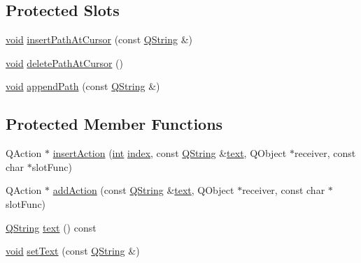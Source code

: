 \subsection*{Protected Slots}
\begin{DoxyCompactItemize}
\item 
\hyperlink{group___u_a_v_objects_plugin_ga444cf2ff3f0ecbe028adce838d373f5c}{void} \hyperlink{class_utils_1_1_path_list_editor_ab3be814407ee47387ca049bfd93780fb}{insert\-Path\-At\-Cursor} (const \hyperlink{group___u_a_v_objects_plugin_gab9d252f49c333c94a72f97ce3105a32d}{Q\-String} \&)
\item 
\hyperlink{group___u_a_v_objects_plugin_ga444cf2ff3f0ecbe028adce838d373f5c}{void} \hyperlink{class_utils_1_1_path_list_editor_a117c18f87a59dac54632f3b5e775bd72}{delete\-Path\-At\-Cursor} ()
\item 
\hyperlink{group___u_a_v_objects_plugin_ga444cf2ff3f0ecbe028adce838d373f5c}{void} \hyperlink{class_utils_1_1_path_list_editor_acf378616452930cf50c4a54957e5d142}{append\-Path} (const \hyperlink{group___u_a_v_objects_plugin_gab9d252f49c333c94a72f97ce3105a32d}{Q\-String} \&)
\end{DoxyCompactItemize}
\subsection*{Protected Member Functions}
\begin{DoxyCompactItemize}
\item 
Q\-Action $\ast$ \hyperlink{class_utils_1_1_path_list_editor_a5ff6cc4033c262c8f3925446b6266280}{insert\-Action} (\hyperlink{ioapi_8h_a787fa3cf048117ba7123753c1e74fcd6}{int} \hyperlink{glext_8h_ab47dd9958bcadea08866b42bf358e95e}{index}, const \hyperlink{group___u_a_v_objects_plugin_gab9d252f49c333c94a72f97ce3105a32d}{Q\-String} \&\hyperlink{class_utils_1_1_path_list_editor_afe432e8e2962ada8ff59067ae2403b72}{text}, Q\-Object $\ast$receiver, const char $\ast$slot\-Func)
\item 
Q\-Action $\ast$ \hyperlink{class_utils_1_1_path_list_editor_a7ad40d88b0bf500e8592c54089f37160}{add\-Action} (const \hyperlink{group___u_a_v_objects_plugin_gab9d252f49c333c94a72f97ce3105a32d}{Q\-String} \&\hyperlink{class_utils_1_1_path_list_editor_afe432e8e2962ada8ff59067ae2403b72}{text}, Q\-Object $\ast$receiver, const char $\ast$slot\-Func)
\item 
\hyperlink{group___u_a_v_objects_plugin_gab9d252f49c333c94a72f97ce3105a32d}{Q\-String} \hyperlink{class_utils_1_1_path_list_editor_afe432e8e2962ada8ff59067ae2403b72}{text} () const 
\item 
\hyperlink{group___u_a_v_objects_plugin_ga444cf2ff3f0ecbe028adce838d373f5c}{void} \hyperlink{class_utils_1_1_path_list_editor_a29e4a886c1d4e3923dc2f9f3d625835e}{set\-Text} (const \hyperlink{group___u_a_v_objects_plugin_gab9d252f49c333c94a72f97ce3105a32d}{Q\-String} \&)
\end{DoxyCompactItemize}
